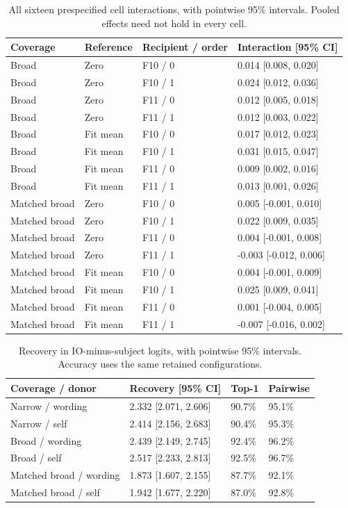 \begin{table}[htbp]
\centering\footnotesize
\setlength{\tabcolsep}{3pt}
\caption{All sixteen prespecified cell interactions, with pointwise 95\% intervals. Pooled effects need not hold in every cell.}
\label{tab:b008-cells}
\begin{tabular}{@{}llll@{}}
\toprule
Coverage & Reference & Recipient / order & Interaction [95\% CI] \\
\midrule
Broad & Zero & F10 / 0 & 0.014 [0.008, 0.020] \\
Broad & Zero & F10 / 1 & 0.024 [0.012, 0.036] \\
Broad & Zero & F11 / 0 & 0.012 [0.005, 0.018] \\
Broad & Zero & F11 / 1 & 0.012 [0.003, 0.022] \\
Broad & Fit mean & F10 / 0 & 0.017 [0.012, 0.023] \\
Broad & Fit mean & F10 / 1 & 0.031 [0.015, 0.047] \\
Broad & Fit mean & F11 / 0 & 0.009 [0.002, 0.016] \\
Broad & Fit mean & F11 / 1 & 0.013 [0.001, 0.026] \\
Matched broad & Zero & F10 / 0 & 0.005 [-0.001, 0.010] \\
Matched broad & Zero & F10 / 1 & 0.022 [0.009, 0.035] \\
Matched broad & Zero & F11 / 0 & 0.004 [-0.001, 0.008] \\
Matched broad & Zero & F11 / 1 & -0.003 [-0.012, 0.006] \\
Matched broad & Fit mean & F10 / 0 & 0.004 [-0.001, 0.009] \\
Matched broad & Fit mean & F10 / 1 & 0.025 [0.009, 0.041] \\
Matched broad & Fit mean & F11 / 0 & 0.001 [-0.004, 0.005] \\
Matched broad & Fit mean & F11 / 1 & -0.007 [-0.016, 0.002] \\
\bottomrule
\end{tabular}
\end{table}

\begin{table}[htbp]
\centering\footnotesize
\setlength{\tabcolsep}{3pt}
\caption{Recovery in IO-minus-subject logits, with pointwise 95\% intervals. Accuracy uses the same retained configurations.}
\label{tab:b008-behavior}
\begin{tabular}{@{}llll@{}}
\toprule
Coverage / donor & Recovery [95\% CI] & Top-1 & Pairwise \\
\midrule
Narrow / wording & 2.332 [2.071, 2.606] & 90.7\% & 95.1\% \\
Narrow / self & 2.414 [2.156, 2.683] & 90.4\% & 95.3\% \\
Broad / wording & 2.439 [2.149, 2.745] & 92.4\% & 96.2\% \\
Broad / self & 2.517 [2.233, 2.813] & 92.5\% & 96.7\% \\
Matched broad / wording & 1.873 [1.607, 2.155] & 87.7\% & 92.1\% \\
Matched broad / self & 1.942 [1.677, 2.220] & 87.0\% & 92.8\% \\
\bottomrule
\end{tabular}
\end{table}


